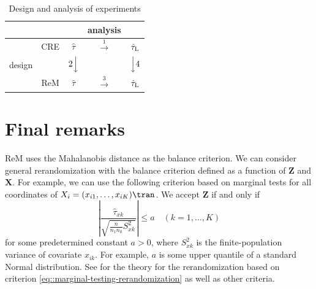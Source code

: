 \begin{table}
\centering
\caption{Design and analysis of experiments}\label{tb::design-analysis-2x2}
\label{tb::rerandomization-regression}
\begin{tabular}{c|cccc}
\hline 
  & & & analysis & \\
  \hline 
  & CRE & $\hat\tau$ \citep{Neyman:1923} &  $\stackrel{1}{\longrightarrow}$  &  $\hat\tau_\textsc{L}$ \citep{lin2013} \\
  design&  &  $2\Big\downarrow$ && $  \Big\downarrow 4$ \\
  & ReM & $\hat\tau$  \citep{li2018asymptotic} &  $\stackrel{3}{\longrightarrow}$  &$\hat\tau_\textsc{L}$ \citep{li2019rerandomization}  \\
  \hline 
\end{tabular}
\end{table}



 

\section{Final remarks}

ReM uses the Mahalanobis distance as the balance criterion. We can consider general rerandomization with the balance criterion defined as a function of $\bm{Z}$ and $\bm{X}$.  For example, we can use the following criterion based on marginal tests for all coordinates of $X_i = (x_{i1}, \ldots, x_{iK})\tran$. We accept $\bm{Z}$ if and only if 
\begin{equation}
\label{eq::marginal-testing-rerandomization}
\left | \frac{  \hat{\tau}_{xk} }{   \sqrt{  \frac{n}{n_1 n_0} S_{xk}^2       }  }   \right | \leq  a \quad ( k=1,\ldots, K )
\end{equation}
for some predetermined constant $a > 0$, where $S_{xk}^2$ is the finite-population variance of covariate $x_{ik}$.  For example, $a$ is some upper quantile of a standard Normal distribution. See \citet{zhao2021no} for the theory for the rerandomization based on criterion \eqref{eq::marginal-testing-rerandomization} as well as other criteria. 


